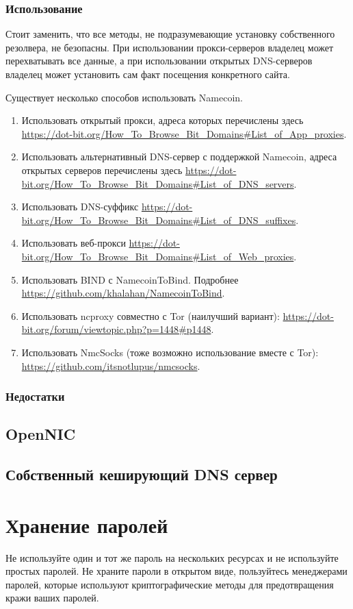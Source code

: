 \subsubsection{Использование}
\begin{important}
Стоит заменить, что все методы, не подразумевающие установку собственного резолвера, не безопасны. При использовании прокси-серверов владелец может перехватывать все данные, а при использовании открытых DNS-серверов владелец может установить сам факт посещения конкретного сайта.
\end{important}
Существует несколько способов использовать Namecoin.
\begin{enumerate}
\item Использовать открытый прокси, адреса которых перечислены здесь \url{https://dot-bit.org/How_To_Browse_Bit_Domains#List_of_App_proxies}.
\item Использовать альтернативный DNS-сервер с поддержкой Namecoin, адреса открытых серверов перечислены здесь \url{https://dot-bit.org/How_To_Browse_Bit_Domains#List_of_DNS_servers}.
\item Использовать DNS-суффикс \url{https://dot-bit.org/How_To_Browse_Bit_Domains#List_of_DNS_suffixes}.
\item Использовать веб-прокси \url{https://dot-bit.org/How_To_Browse_Bit_Domains#List_of_Web_proxies}.
\item Использовать BIND с NamecoinToBind. Подробнее \url{https://github.com/khalahan/NamecoinToBind}.
\item Использовать ncproxy совместно с Tor (наилучший вариант): \url{https://dot-bit.org/forum/viewtopic.php?p=1448#p1448}.
\item Использовать NmcSocks (тоже возможно использование вместе с Tor): \url{https://github.com/itsnotlupus/nmcsocks}.
\end{enumerate}
\subsubsection{Недостатки}
\subsection{OpenNIC}
\subsection{Собственный кеширующий DNS сервер}

\section{Хранение паролей}
\begin{important}
Не используйте один и тот же пароль на нескольких ресурсах и не используйте простых паролей. Не храните пароли в открытом виде, пользуйтесь менеджерами паролей, которые используют криптографические методы для предотвращения кражи ваших паролей.
\end{important}
